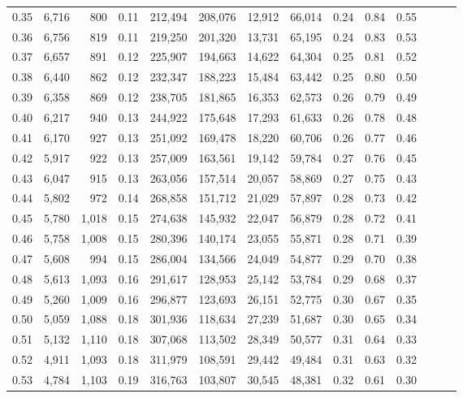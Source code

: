 \begin{tabular}{rrrrrrrrrrrrrr}
0.35 &  6,716 &    800 &  0.11 &  212,494 &  208,076 &  12,912 &  66,014 &  0.24 &  0.84 &      0.55 \\
0.36 &  6,756 &    819 &  0.11 &  219,250 &  201,320 &  13,731 &  65,195 &  0.24 &  0.83 &      0.53 \\
0.37 &  6,657 &    891 &  0.12 &  225,907 &  194,663 &  14,622 &  64,304 &  0.25 &  0.81 &      0.52 \\
0.38 &  6,440 &    862 &  0.12 &  232,347 &  188,223 &  15,484 &  63,442 &  0.25 &  0.80 &      0.50 \\
0.39 &  6,358 &    869 &  0.12 &  238,705 &  181,865 &  16,353 &  62,573 &  0.26 &  0.79 &      0.49 \\
0.40 &  6,217 &    940 &  0.13 &  244,922 &  175,648 &  17,293 &  61,633 &  0.26 &  0.78 &      0.48 \\
0.41 &  6,170 &    927 &  0.13 &  251,092 &  169,478 &  18,220 &  60,706 &  0.26 &  0.77 &      0.46 \\
0.42 &  5,917 &    922 &  0.13 &  257,009 &  163,561 &  19,142 &  59,784 &  0.27 &  0.76 &      0.45 \\
0.43 &  6,047 &    915 &  0.13 &  263,056 &  157,514 &  20,057 &  58,869 &  0.27 &  0.75 &      0.43 \\
0.44 &  5,802 &    972 &  0.14 &  268,858 &  151,712 &  21,029 &  57,897 &  0.28 &  0.73 &      0.42 \\
0.45 &  5,780 &  1,018 &  0.15 &  274,638 &  145,932 &  22,047 &  56,879 &  0.28 &  0.72 &      0.41 \\
0.46 &  5,758 &  1,008 &  0.15 &  280,396 &  140,174 &  23,055 &  55,871 &  0.28 &  0.71 &      0.39 \\
0.47 &  5,608 &    994 &  0.15 &  286,004 &  134,566 &  24,049 &  54,877 &  0.29 &  0.70 &      0.38 \\
0.48 &  5,613 &  1,093 &  0.16 &  291,617 &  128,953 &  25,142 &  53,784 &  0.29 &  0.68 &      0.37 \\
0.49 &  5,260 &  1,009 &  0.16 &  296,877 &  123,693 &  26,151 &  52,775 &  0.30 &  0.67 &      0.35 \\
0.50 &  5,059 &  1,088 &  0.18 &  301,936 &  118,634 &  27,239 &  51,687 &  0.30 &  0.65 &      0.34 \\
0.51 &  5,132 &  1,110 &  0.18 &  307,068 &  113,502 &  28,349 &  50,577 &  0.31 &  0.64 &      0.33 \\
0.52 &  4,911 &  1,093 &  0.18 &  311,979 &  108,591 &  29,442 &  49,484 &  0.31 &  0.63 &      0.32 \\
0.53 &  4,784 &  1,103 &  0.19 &  316,763 &  103,807 &  30,545 &  48,381 &  0.32 &  0.61 &      0.30 \\

\end{tabular}
